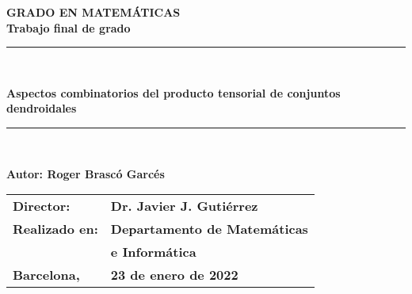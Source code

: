 \documentclass[11pt,a4paper,openright,oneside]{article}
\numberwithin{equation}{section}
\theoremstyle{definition}
\begin{document}
\thispagestyle{empty}


\begin{titlepage}
    \begin{center}
        \begin{figure}[htb]
            \begin{center}
            \end{center}
        \end{figure}
        \vspace*{1cm}
        \textbf{\LARGE GRADO EN MATEM\'{A}TICAS } \\
        \vspace*{.5cm}
        \textbf{\LARGE Trabajo final de grado} \\
        \vspace*{1.5cm}
        \rule{16cm}{0.1mm}\\
        \begin{Huge}
            \textbf{Aspectos combinatorios del producto tensorial de conjuntos dendroidales} \\
        \end{Huge}
        \rule{16cm}{0.1mm}\\
        \vspace{1cm}
        \begin{flushright}
            \textbf{\LARGE Autor: Roger Brasc\'o Garc\'es}
            \vspace*{2cm}
            \renewcommand{\arraystretch}{1.5}
            \begin{tabular}{ll}
                \textbf{\Large Director:}     & \textbf{\Large Dr. Javier J. Guti\'errez }     \\
                \textbf{\Large Realizado en:} & \textbf{\Large  Departamento de Matem\'aticas} \\
                                              & \textbf{\Large e Inform\'atica}                \\
                \textbf{\Large Barcelona,}    & \textbf{\Large 23 de enero de 2022 }
            \end{tabular}
        \end{flushright}
    \end{center}
\end{titlepage}
\newpage
\end{document}
